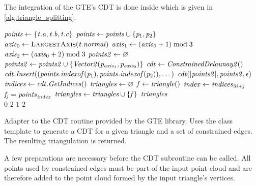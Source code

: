 The integration of the GTE's CDT is done inside  which is given in \cref{alg:triangle_splitting}.
%
\begin{algorithm}
	\centering
	\begin{algorithmic}[1]
			\State $\mathit{points} \gets \{\mathit{t}.\mathit{a}, \mathit{t}.\mathit{b}, \mathit{t}.\mathit{c}\}$ 
				\State $\mathit{points} \gets \mathit{points} \cup \{\mathit{p}_1, \mathit{p}_2\}$
			\EndFor
			\State $\var{axis}_0 \gets \Call{LargestAxis}{\var{t}.\var{normal}}$
			\State $\mathit{axis}_1 \gets (\mathit{axis}_0 + 1) \bmod 3$
			\State $\mathit{axis}_2 \gets (\mathit{axis}_0 + 2) \bmod 3$
			\State $\mathit{points2} \gets \varnothing$ 
				\State $\mathit{points2} \gets \mathit{points2} \cup \{\mathit{Vector2}(\mathit{p}_{\mathit{axis}_1}, \mathit{p}_{\mathit{axis}_2})\}$
			\EndFor
			\State $\mathit{cdt} \gets \mathit{ConstrainedDelaunay2()}$
			 
				\State $\mathit{cdt}.\mathit{Insert}((\mathit{points}.\mathit{indexof}(\mathit{p}_1), \mathit{points}.\mathit{indexof}(\mathit{p}_2)), \dots)$
			\EndFor
			\State $\mathit{cdt}(|\mathit{points2}|, \mathit{points2}, \epsilon)$ 
			\State $\mathit{indices} \gets \mathit{cdt}.\mathit{GetIndices}()$
			\State $\mathit{triangles} \gets \varnothing$
				\State $\mathit{f} \gets \mathit{triangle()}$
					\State $\mathit{index} \gets \mathit{indices}_{3\mathit{i} + \mathit{j}}$
					\State $\mathit{f}_{\mathit{j}} = \mathit{points}_{\mathit{index}}$
				\EndFor
				\State $\mathit{triangles} \gets \mathit{triangles} \cup \{\mathit{f}\}$
			\EndFor
			\State \Return $\mathit{triangles}$
		\EndFunction
		\\
					\State \Return $0$
				\Else
					\State \Return $2$
				\EndIf
			\Else
					\State \Return $1$
				\Else
					\State \Return $2$
				\EndIf
			\EndIf
		\EndFunction
	\end{algorithmic}
	\caption[GTE CDT adapter]{
		Adapter to the CDT routine provided by the GTE library.
		Uses the  class template to generate a CDT for a given triangle and a set of constrained edges.
		The resulting triangulation is returned.
	}
	\label{alg:triangle_splitting}
\end{algorithm}
%
A few preparations are necessary before the CDT subroutine can be called.
All points used by constrained edges must be part of the input point cloud and are therefore added to the point cloud formed by the input triangle's vertices.

